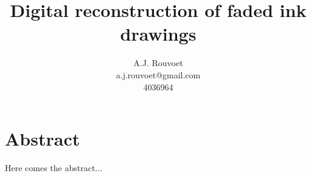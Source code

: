 \documentclass[a4paper]{article}
\author{A.J. Rouvoet\\ a.j.rouvoet@gmail.com \\ 4036964}
\title{Digital reconstruction of faded ink drawings}
\begin{document}
	\maketitle

	\section*{Abstract}
		
		Here comes the abstract...

	\tableofcontents

	
\end{document}
